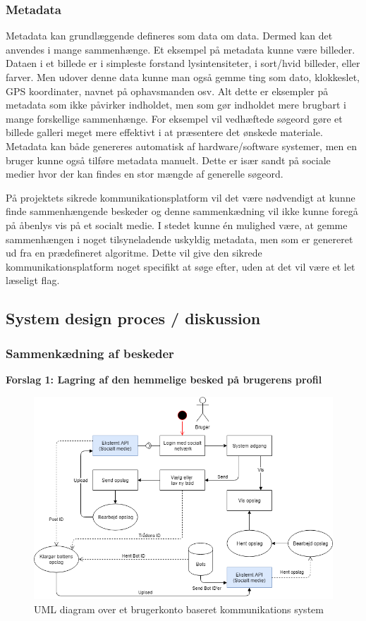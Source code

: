 \subsubsection{Metadata}
\label{Metadata}
Metadata kan grundlæggende defineres som data om data. Dermed kan det anvendes i mange sammenhænge. Et eksempel på metadata kunne være billeder. Dataen i et billede er i simpleste forstand lysintensiteter, i sort/hvid billeder, eller farver. Men udover denne data kunne man også gemme ting som dato, klokkeslet, GPS koordinater, navnet på ophavsmanden osv. Alt dette er eksempler på metadata som ikke påvirker indholdet, men som gør indholdet mere brugbart i mange forskellige sammenhænge. For eksempel vil vedhæftede søgeord gøre et billede galleri meget mere effektivt i at præsentere det ønskede materiale. Metadata kan både genereres automatisk af hardware/software systemer, men en bruger kunne også tilføre metadata manuelt. Dette er især sandt på sociale medier hvor der kan findes en stor mængde af generelle søgeord.

På projektets sikrede kommunikationsplatform vil det være nødvendigt at kunne finde sammenhængende beskeder og denne sammenkædning vil ikke kunne foregå på åbenlys vis på et socialt medie. I stedet kunne én mulighed være, at gemme sammenhængen i noget tilsyneladende uskyldig metadata, men som er genereret ud fra en prædefineret algoritme. Dette vil give den sikrede kommunikationsplatform noget specifikt at søge efter, uden at det vil være et let læseligt flag.

\subsection{System design proces / diskussion}

\subsubsection{Sammenkædning af beskeder}

\textbf{Forslag 1: Lagring af den hemmelige besked på brugerens profil}
\begin{figure}[H]
    \centering
    \includegraphics[width=0.8\linewidth]{Projectdoc/Assets/Illustrationer/userbased-system.png}
    \caption{UML diagram over et brugerkonto baseret kommunikations system}
    \label{fig:userbased}
\end{figure}

